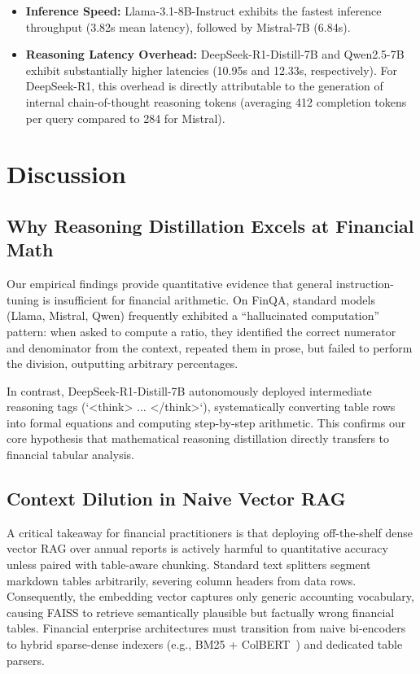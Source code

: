 \documentclass[11pt]{article}
\begin{document}
\begin{itemize}
    \item \textbf{Inference Speed:} Llama-3.1-8B-Instruct exhibits the fastest inference throughput (3.82s mean latency), followed by Mistral-7B (6.84s).
    \item \textbf{Reasoning Latency Overhead:} DeepSeek-R1-Distill-7B and Qwen2.5-7B exhibit substantially higher latencies (10.95s and 12.33s, respectively). For DeepSeek-R1, this overhead is directly attributable to the generation of internal chain-of-thought reasoning tokens (averaging 412 completion tokens per query compared to 284 for Mistral).
\end{itemize}

\section{Discussion}
\label{sec:discussion}

\subsection{Why Reasoning Distillation Excels at Financial Math}
Our empirical findings provide quantitative evidence that general instruction-tuning is insufficient for financial arithmetic. On FinQA, standard models (Llama, Mistral, Qwen) frequently exhibited a ``hallucinated computation'' pattern: when asked to compute a ratio, they identified the correct numerator and denominator from the context, repeated them in prose, but failed to perform the division, outputting arbitrary percentages. 

In contrast, DeepSeek-R1-Distill-7B autonomously deployed intermediate reasoning tags (`<think> ... </think>`), systematically converting table rows into formal equations and computing step-by-step arithmetic. This confirms our core hypothesis that mathematical reasoning distillation directly transfers to financial tabular analysis.

\subsection{Context Dilution in Naive Vector RAG}
A critical takeaway for financial practitioners is that deploying off-the-shelf dense vector RAG over annual reports is actively harmful to quantitative accuracy unless paired with table-aware chunking. Standard text splitters segment markdown tables arbitrarily, severing column headers from data rows. Consequently, the embedding vector captures only generic accounting vocabulary, causing FAISS to retrieve semantically plausible but factually wrong financial tables. Financial enterprise architectures must transition from naive bi-encoders to hybrid sparse-dense indexers (e.g., BM25 + ColBERT~\citep{khattab2020colbert}) and dedicated table parsers.
\end{document}
